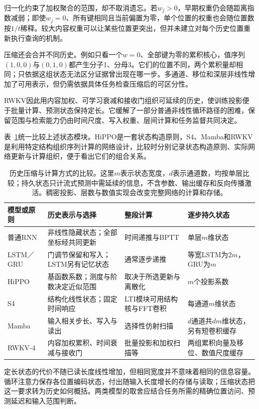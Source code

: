 归一化约束了加权聚合的范围，却不取消遗忘。若$w_j>0$，早期权重仍会随距离指数减弱；即使$w_j=0$、所有键相同且当前偏置为零，单个位置的权重也会随位置数按$1/t$稀释。较大内容权重可以让某些位置更突出，但并未建立对每个历史位置重新执行查询的机制。

压缩还会合并不同历史。例如只看一个$w=0$、全部键为零的累积核心，值序列$(1,0,0)$与$(0,1,0)$都产生分子1、分母3。它们的位置不同，两个累积量却相同；只依据这组状态无法区分证据曾出现在哪一步。多通道、移位和深层非线性增加了可用表示，但仍需依据具体任务检查压缩后的可区分性。

RWKV因此用内容加权、可学习衰减和接收门组织可延续的历史，使训练投影便于批量计算、预测状态保持定长。它缓解了一部分普通非线性循环路径的困难，保留范围与检索能力仍由时间尺度、写入权重、层间计算和任务监督共同决定。

表~\ref{tab:rnn-state-models}统一比较上述状态模块。HiPPO是一套状态构造原则，S4、Mamba和RWKV是利用特定结构组织序列计算的网络设计，比较时分别记录状态构造原则、实际网络更新与计算组织，便于看出它们的组合关系。

\begin{table}[htb]
  \small
  \begin{tabularx}{\linewidth}{@{}p{19mm}XXX@{}}
    \toprule
    模型或原则 & 历史表示与选择 & 整段计算 & 逐步持久状态 \\
    \midrule
    普通RNN & 非线性隐藏状态；全部坐标经共同更新 & 时间递推与BPTT & 单层$m$维状态 \\
    LSTM／GRU & 门调节保留和写入；LSTM另有记忆状态 & 通常逐步递推 & 等宽LSTM为$2m$，GRU为$m$ \\
    HiPPO & 基函数系数；测度与阶数决定近似范围 & 取决于所选更新与离散化 & $m$个投影系数 \\
    S4 & 结构化线性状态；固定时间响应 & LTI模块可用结构核与FFT卷积 & 每通道$m$维状态 \\
    Mamba & 输入相关步长、写入与读出 & 选择性仿射扫描 & $d$通道共$dm$维状态，另有短卷积缓存 \\
    RWKV-4 & 内容加权累积、时间衰减与接收门 & 批量投影和加权扫描等 & 两组累积向量及移位、数值尺度缓存 \\
    \bottomrule
  \end{tabularx}
  \caption{历史压缩与计算方式的比较。这里$m$表示状态宽度，$d$表示通道数，均按单层比较；持久状态只计流式预测中需延续的信息，不含参数、输出缓存和反向传播激活。稠密投影、层数与数值实现会改变完整网络的计算和存储。}
  \label{tab:rnn-state-models}
\end{table}

定长状态的代价不随已读长度线性增加，但相同宽度并不意味着相同的信息容量。循环注意力保存各位置编码状态，付出随输入长度增长的存储与读取；压缩状态把这一要求转为历史如何概括。两类模型的取舍应结合任务所需的精确位置访问、预测延迟和输入范围判断。

